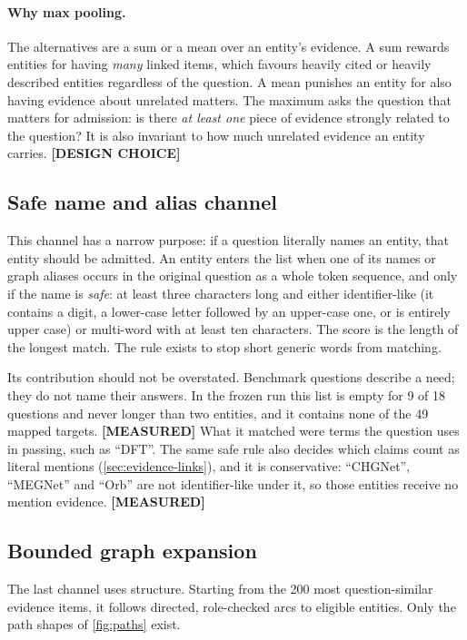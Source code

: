 \documentclass[11pt,a4paper]{article}
\newcommand{\cref}[1]{\autoref{#1}}
\theoremstyle{remark}
\newcommand{\vtag}[2]{{\sffamily\scriptsize\bfseries\textcolor{#1}{[#2]}}}
\newcommand{\Mtag}{\vtag{measgreen}{MEASURED}}
\newcommand{\Dtag}{\vtag{black!60}{DESIGN CHOICE}}
\begin{document}
\paragraph{Why max pooling.} The alternatives are a sum or a mean over an entity's
evidence. A sum rewards entities for having \emph{many} linked items, which favours
heavily cited or heavily described entities regardless of the question. A mean punishes an
entity for also having evidence about unrelated matters. The maximum asks the question
that matters for admission: is there \emph{at least one} piece of evidence strongly
related to the question? It is also invariant to how much unrelated evidence an entity
carries. \Dtag

\subsection{Safe name and alias channel}
\label{sec:name-channel}

This channel has a narrow purpose: if a question literally names an entity, that entity
should be admitted. An entity enters the list when one of its names or graph aliases
occurs in the original question as a whole token sequence, and only if the name is
\emph{safe}: at least three characters long and either identifier-like (it contains a
digit, a lower-case letter followed by an upper-case one, or is entirely upper case) or
multi-word with at least ten characters. The score is the length of the longest match.
The rule exists to stop short generic words from matching.

Its contribution should not be overstated. Benchmark questions describe a need; they do
not name their answers. In the frozen run this list is empty for 9 of 18 questions and
never longer than two entities, and it contains none of the 49 mapped targets. \Mtag{}
What it matched were terms the question uses in passing, such as ``DFT''. The same safe
rule also decides which claims count as literal mentions (\cref{sec:evidence-links}),
and it is conservative: ``CHGNet'', ``MEGNet'' and ``Orb'' are not identifier-like under
it, so those entities receive no mention evidence. \Mtag

\subsection{Bounded graph expansion}
\label{sec:graph-channel}

The last channel uses structure. Starting from the 200 most question-similar evidence
items, it follows directed, role-checked arcs to eligible entities. Only the path shapes
of \cref{fig:paths} exist.
\end{document}
